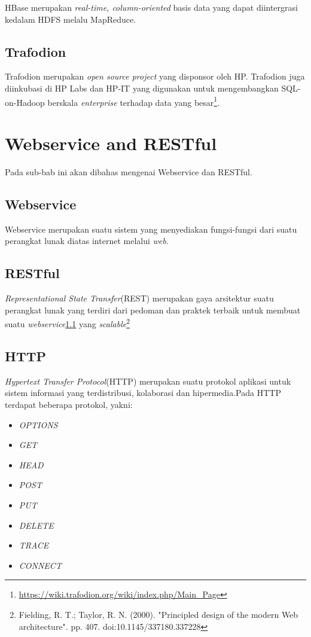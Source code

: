 HBase merupakan \textit{real-time, column-oriented} basis data yang dapat diintergrasi kedalam HDFS melalu MapReduce.


\subsection{Trafodion}
\label{subsec:trafodian}

Trafodion merupakan \textit{open source project} yang disponsor oleh HP. Trafodion juga diinkubasi di HP Labs dan HP-IT yang digunakan untuk mengembangkan SQL-on-Hadoop berskala \textit{enterprise} terhadap data yang besar\footnote{\url{https://wiki.trafodion.org/wiki/index.php/Main\_Page}}. 

\section{Webservice and RESTful}
\label{sec:webserviceansrestful}

Pada sub-bab ini akan dibahas mengenai Webservice dan RESTful.

\subsection{Webservice}
\label{subsec:webservice}

Webservice merupakan suatu sistem yang menyediakan fungsi-fungsi dari suatu perangkat lunak diatas internet melalui \textit{web}.

\subsection{RESTful}
\label{subsec:restful}

\textit{Representational State Transfer}(REST) merupakan gaya arsitektur suatu perangkat lunak yang terdiri dari pedoman dan praktek terbaik untuk membuat suatu \textit{webservice}\ref{subsec:webservice} yang \textit{scalable}\footnote{Fielding, R. T.; Taylor, R. N. (2000). "Principled design of the modern Web architecture". pp. 407. doi:10.1145/337180.337228}

\subsection{HTTP}
\label{subsec:http}

\textit{Hypertext Transfer Protocol}(HTTP) merupakan suatu protokol aplikasi untuk sistem informasi yang terdistribusi, kolaborasi dan hipermedia.Pada HTTP terdapat beberapa protokol, yakni:
\begin{itemize}
	\item \textit{OPTIONS}
	\item \textit{GET}
	\item \textit{HEAD}
	\item \textit{POST}
	\item \textit{PUT}
	\item \textit{DELETE}
	\item \textit{TRACE}
	\item \textit{CONNECT}
\end{itemize}

